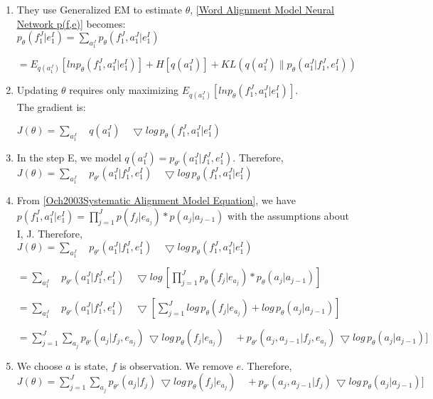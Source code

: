 \documentclass{article}
\begin{document}
\begin{enumerate}
\item They use Generalized EM to estimate $\theta$, \eqref{Word Alignment Model Neural Network p(f,e)} becomes:\\

$p_{\theta}(f_1^J|e_1^I) = \sum_{a_1^J} p_{\theta}(f_1^J, a_1^J|e_1^I)$

$ = E_{q(a_1^J)} [ln p_{\theta}(f_1^J, a_1^J|e_1^I) ] + H[q(a_1^J)] + KL(q(a_1^J) \| p_{\theta}(a_1^J|f_1^J,e_1^I) ) $

\item Updating $\theta$ requires only maximizing $E_{q(a_1^J)} [ln p_{\theta}(f_1^J, a_1^J|e_1^I) ]$. \\ The gradient is: \\

$ J(\theta) = \sum_{a_1^J} \quad q(a_1^J)\quad \bigtriangledown log \, p_{\theta}(f_1^J, a_1^J|e_1^I)  $

\item In the step E, we model $q(a_1^J) = p_{\theta'}(a_1^J|f_1^J,e_1^I)$.
Therefore,\\

$ J(\theta) = \sum_{a_1^J} \quad p_{\theta'}(a_1^J|f_1^J,e_1^I) \quad \bigtriangledown log \, p_{\theta}(f_1^J, a_1^J|e_1^I)  $

\item From \eqref{Och2003Systematic Alignment Model Equation}, we have \\
$p(f_1^J, a_1^J|e_1^I) = \prod_{j=1}^J p(f_j | e_{a_j}) * p(a_j | a_{j-1})$  with the assumptions about I, J.
Therefore, \\

$ J(\theta) = \sum_{a_1^J} \quad p_{\theta'}(a_1^J|f_1^J,e_1^I) \quad \bigtriangledown log \, p_{\theta}(f_1^J, a_1^J|e_1^I)  $

$ = \sum_{a_1^J} \quad p_{\theta'}(a_1^J|f_1^J,e_1^I) \quad \bigtriangledown log \, [\prod_{j=1}^J p_{\theta}(f_j | e_{a_j}) * p_{\theta}(a_j | a_{j-1})  ] $

$ = \sum_{a_1^J} \quad p_{\theta'}(a_1^J|f_1^J,e_1^I) \quad \bigtriangledown [\sum_{j=1}^J log \, p_{\theta}(f_j | e_{a_j}) + log \, p_{\theta}(a_j | a_{j-1})  ] $

$ = \sum_{j=1}^J \sum_{a_j} p_{\theta'}(a_j|f_j,e_{a_j}) \, \bigtriangledown log \, p_{\theta}(f_j | e_{a_j}) \quad + p_{\theta'}(a_j, a_{j-1}|f_j,e_{a_j}) \, \bigtriangledown log \, p_{\theta}(a_j | a_{j-1})  ] $

\item We choose $a$ is state, $f$ is observation. We remove $e$.
Therefore, \\

$ J(\theta) = \sum_{j=1}^J \sum_{a_j} p_{\theta'}(a_j|f_j) \, \bigtriangledown log \, p_{\theta}(f_j | e_{a_j}) \quad + p_{\theta'}(a_j, a_{j-1}|f_j) \, \bigtriangledown log \, p_{\theta}(a_j | a_{j-1})  ] $

\end{enumerate}
\end{document}
